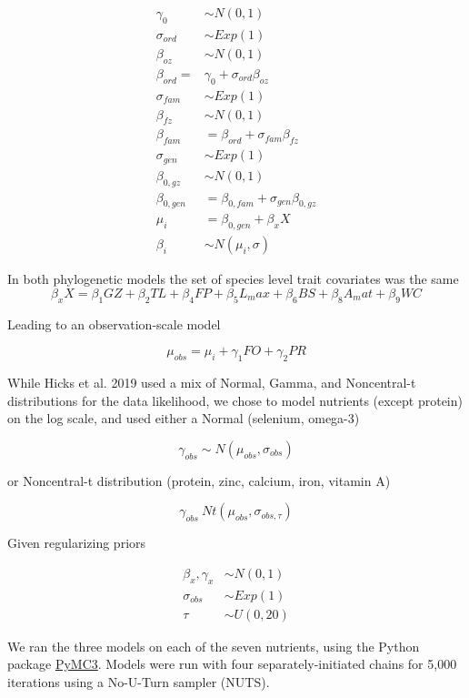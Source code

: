 \documentclass{article}
\begin{document}
\begin{align*}
\gamma_0 &\sim N(0,1)\\
\sigma_{ord} &\sim Exp(1)\\
\beta_{oz} &\sim N(0,1)\\
\beta_{ord} = &\gamma_0+\sigma_{ord} \beta_{oz}\\
\sigma_{fam} &\sim Exp(1)\\
\beta_{fz} &\sim N(0,1)\\
\beta_{fam} &= \beta_{ord}+\sigma_{fam} \beta_{fz}\\
\sigma_{gen} &\sim Exp(1)\\
\beta_{0,gz} &\sim N(0,1)\\
\beta_{0,gen} &= \beta_{0,fam}+\sigma_{gen} \beta_{0,gz}\\
\mu_i &= \beta_{0,gen}+\beta_x X\\
\beta_i &\sim N(\mu_i,\sigma)
\end{align*}

In both phylogenetic models the set of species level trait covariates was the same
\[
\beta_x X = \beta_1 GZ+\beta_2 TL+\beta_4 FP+\beta_5 L_max+\beta_6 BS+\beta_8 A_mat+\beta_9 WC
\]

Leading to an observation-scale model

\[
\mu_{obs} = \mu_i+\gamma_1 FO+\gamma_2 PR
\]

While Hicks et al. 2019 used a mix of Normal, Gamma, and Noncentral-t distributions for the data likelihood, we chose to model nutrients (except protein) on the log scale, and used either a Normal (selenium, omega-3) 

\[
\gamma_{obs} \sim N(\mu_{obs},\sigma_{obs})
\]

or Noncentral-t distribution (protein, zinc, calcium, iron, vitamin A)

\[
\gamma_{obs}~Nt(\mu_{obs},\sigma_{obs,\tau})
\]

Given regularizing priors

\begin{align*}
\beta_x, \gamma_x &\sim N(0,1) \\
\sigma_{obs} &\sim Exp(1)\\ 
\tau &\sim U(0,20)
\end{align*}

We ran the three models on each of the seven nutrients, using the Python package \href{https://docs.pymc.io/}{PyMC3}. Models were run with four separately-initiated chains for 5,000 iterations using a No-U-Turn sampler (NUTS). 
\end{document}
